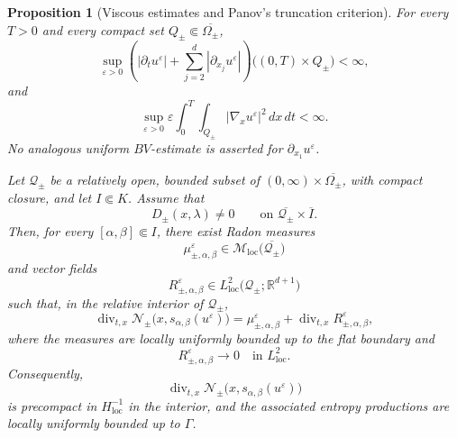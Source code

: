 \documentclass[11pt]{amsart}
\numberwithin{equation}{section}
\theoremstyle{plain}
\newtheorem{proposition}[theorem]{Proposition}
\theoremstyle{definition}
\theoremstyle{remark}
\begin{document}
\begin{proposition}[Viscous estimates and Panov's truncation criterion]
\label{prop:flat-viscous-panov-criterion}
For every \(T>0\) and every compact set
\(Q_\pm\Subset\overline{\Omega_\pm}\),
\begin{equation}
\label{eq:flat-tangential-bv-estimates}
    \sup_{\varepsilon>0}
    \left(
        |\partial_tu^\varepsilon|
        +
        \sum_{j=2}^d|\partial_{x_j}u^\varepsilon|
    \right)
    \bigl((0,T)\times Q_\pm\bigr)
    <\infty,
\end{equation}
and
\begin{equation}
\label{eq:flat-local-viscous-energy}
    \sup_{\varepsilon>0}
    \varepsilon
    \int_0^T\int_{Q_\pm}
        |\nabla_xu^\varepsilon|^2\,dx\,dt
    <\infty.
\end{equation}
No analogous uniform \(BV\)-estimate is asserted for
\(\partial_{x_1}u^\varepsilon\).

Let \(\mathcal Q_\pm\) be a relatively open, bounded subset of
\((0,\infty)\times\overline{\Omega_\pm}\), with compact closure, and let
\(I\Subset K\). Assume that
\begin{equation}
\label{eq:flat-cylinder-nondegeneracy}
    D_\pm(x,\lambda)\neq0
    \qquad
    \text{on }\overline{\mathcal Q_\pm}\times\overline I.
\end{equation}
Then, for every \([\alpha,\beta]\Subset I\), there exist Radon measures
\[
    \mu_{\pm,\alpha,\beta}^\varepsilon
    \in
    \mathcal M_{\mathrm{loc}}
    \bigl(\overline{\mathcal Q_\pm}\bigr)
\]
and vector fields
\[
    R_{\pm,\alpha,\beta}^\varepsilon
    \in
    L^2_{\mathrm{loc}}
    \bigl(\mathcal Q_\pm;\mathbb R^{d+1}\bigr)
\]
such that, in the relative interior of \(\mathcal Q_\pm\),
\begin{equation}
\label{eq:flat-replaced-truncation-decomposition}
    \operatorname{div}_{t,x}
    \mathcal N_\pm
    \bigl(x,s_{\alpha,\beta}(u^\varepsilon)\bigr)
    =
    \mu_{\pm,\alpha,\beta}^\varepsilon
    +
    \operatorname{div}_{t,x}
        R_{\pm,\alpha,\beta}^\varepsilon,
\end{equation}
where the measures are locally uniformly bounded up to the flat boundary and
\begin{equation}
\label{eq:flat-replaced-remainder}
    R_{\pm,\alpha,\beta}^\varepsilon
    \longrightarrow0
    \quad\text{in }L^2_{\mathrm{loc}}.
\end{equation}
Consequently,
\begin{equation}
\label{eq:flat-replaced-panov-criterion}
    \operatorname{div}_{t,x}
    \mathcal N_\pm
    \bigl(x,s_{\alpha,\beta}(u^\varepsilon)\bigr)
\end{equation}
is precompact in \(H^{-1}_{\mathrm{loc}}\) in the interior, and the
associated entropy productions are locally uniformly bounded up to
\(\Gamma\).
\end{proposition}
\end{document}
